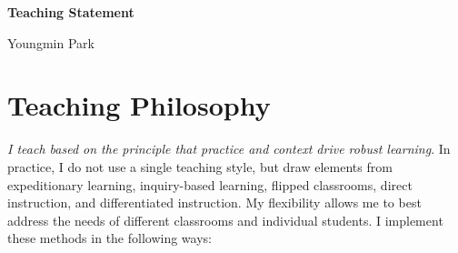 \documentclass[a4paper,11pt]{article}
\begin{document}
	
	\begin{center}
		\Large \textbf{Teaching Statement}
		
		\Large Youngmin Park
	\end{center}
	
	
	
	\section{Teaching Philosophy}
	
	\textit{I teach based on the principle that practice and context drive robust learning}. In practice, I do not use a single teaching style, but draw elements from expeditionary learning, inquiry-based learning, flipped classrooms, direct instruction, and differentiated instruction. My flexibility allows me to best address the needs of different classrooms and individual students. I implement these methods in the following ways:
	
\end{document}
